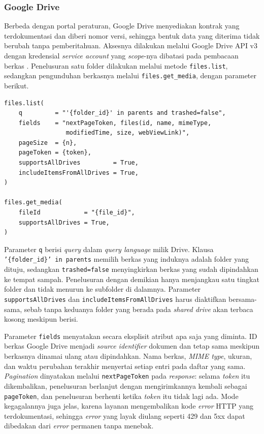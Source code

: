 \subsubsection{Google Drive}
\label{sec:analisis-drive}

Berbeda dengan portal peraturan, Google Drive menyediakan kontrak yang terdokumentasi dan diberi nomor versi, sehingga bentuk data yang diterima tidak berubah tanpa pemberitahuan.
Aksesnya dilakukan melalui Google Drive API v3 dengan kredensial \textit{service account} yang \textit{scope}-nya dibatasi pada pembacaan berkas \parencite{google2025driveapi}.
Penelusuran satu folder dilakukan melalui metode \texttt{files.list}, sedangkan pengunduhan berkasnya melalui \texttt{files.get\_media}, dengan parameter berikut.

\par\vspace{0.85\baselineskip}
\begingroup
\setlength{\parskip}{0pt}
\setlength{\topsep}{0pt}
\setlength{\partopsep}{0pt}
\singlespacing
\small
\begin{verbatim}
files.list(
    q         = "'{folder_id}' in parents and trashed=false",
    fields    = "nextPageToken, files(id, name, mimeType,
                 modifiedTime, size, webViewLink)",
    pageSize  = {n},
    pageToken = {token},
    supportsAllDrives         = True,
    includeItemsFromAllDrives = True,
)

files.get_media(
    fileId            = "{file_id}",
    supportsAllDrives = True,
)
\end{verbatim}
\endgroup
\vspace{0.15\baselineskip}

Parameter \texttt{q} berisi \textit{query} dalam \textit{query language} milik Drive.
Klausa \texttt{'\{folder\_id\}' in parents} memilih berkas yang induknya adalah folder yang dituju, sedangkan \texttt{trashed=false} menyingkirkan berkas yang sudah dipindahkan ke tempat sampah.
Penelusuran dengan demikian hanya menjangkau satu tingkat folder dan tidak menurun ke subfolder di dalamnya.
Parameter \texttt{supports\allowbreak AllDrives} dan \texttt{include\allowbreak Items\allowbreak From\allowbreak AllDrives} harus diaktifkan bersama-sama, sebab tanpa keduanya folder yang berada pada \textit{shared drive} akan terbaca kosong meskipun berisi.

Parameter \texttt{fields} menyatakan secara eksplisit atribut apa saja yang diminta.
ID berkas Google Drive menjadi \textit{source identifier} dokumen dan tetap sama meskipun berkasnya dinamai ulang atau dipindahkan.
Nama berkas, \textit{MIME type}, ukuran, dan waktu perubahan terakhir menyertai setiap entri pada daftar yang sama.
\textit{Pagination} dinyatakan melalui \texttt{nextPageToken} pada \textit{response}: selama \textit{token} itu dikembalikan, penelusuran berlanjut dengan mengirimkannya kembali sebagai \texttt{pageToken}, dan penelusuran berhenti ketika \textit{token} itu tidak lagi ada.
Mode kegagalannya juga jelas, karena layanan mengembalikan kode \textit{error} HTTP yang terdokumentasi, sehingga \textit{error} yang layak diulang seperti 429 dan 5xx dapat dibedakan dari \textit{error} permanen tanpa menebak.

